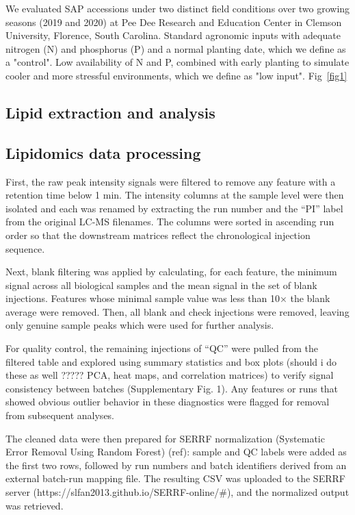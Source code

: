 \documentclass[10pt,letterpaper]{article}
\begin{document}
We evaluated SAP accessions under two distinct field conditions over two growing seasons (2019 and 2020) at Pee Dee Research and Education Center in Clemson University, Florence, South Carolina. Standard agronomic inputs with adequate nitrogen (N) and phosphorus (P) and a normal planting date, which we define as a "control". Low availability of N and P, combined with early planting to simulate cooler and more stressful environments, which we define as "low input". Fig~\ref{fig1}


\subsection*{Lipid extraction and analysis}


\subsection*{Lipidomics data processing}
First, the raw peak intensity signals were filtered to remove any feature with a retention time below 1 min. The intensity columns at the sample level were then isolated and each was renamed by extracting the run number and the “PI” label from the original LC-MS filenames. The columns were sorted in ascending run order so that the downstream matrices reflect the chronological injection sequence.

Next, blank filtering was applied by calculating, for each feature, the minimum signal across all biological samples and the mean signal in the set of blank injections. Features whose minimal sample value was less than 10× the blank average were removed. Then, all blank and check injections were removed, leaving only genuine sample peaks which were used for further analysis.

For quality control, the remaining injections of “QC” were pulled from the filtered table and explored using summary statistics and box plots (should i do these as well ????? PCA, heat maps, and correlation matrices) to verify signal consistency between batches (Supplementary Fig. 1). Any features or runs that showed obvious outlier behavior in these diagnostics were flagged for removal from subsequent analyses.

The cleaned data were then prepared for SERRF normalization (Systematic Error Removal Using Random Forest) (ref): sample and QC labels were added as the first two rows, followed by run numbers and batch identifiers derived from an external batch-run mapping file. The resulting CSV was uploaded to the SERRF server (https://slfan2013.github.io/SERRF-online/#), and the normalized output was retrieved.
\end{document}
